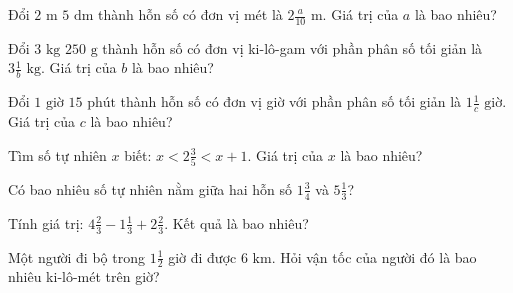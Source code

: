 \begin{ex}
  Đổi $2\text{ m } 5\text{ dm}$ thành hỗn số có đơn vị mét là $2\frac{a}{10}\text{ m}$. Giá trị của $a$ là bao nhiêu?
\end{ex}

\begin{ex}
  Đổi $3\text{ kg } 250\text{ g}$ thành hỗn số có đơn vị ki-lô-gam với phần phân số tối giản là $3\frac{1}{b}\text{ kg}$. Giá trị của $b$ là bao nhiêu?
\end{ex}

\begin{ex}
  Đổi $1\text{ giờ } 15\text{ phút}$ thành hỗn số có đơn vị giờ với phần phân số tối giản là $1\frac{1}{c}\text{ giờ}$. Giá trị của $c$ là bao nhiêu?
\end{ex}

\begin{ex}
  Tìm số tự nhiên $x$ biết: $x < 2\frac{3}{5} < x + 1$. Giá trị của $x$ là bao nhiêu?
\end{ex}

\begin{ex}
  Có bao nhiêu số tự nhiên nằm giữa hai hỗn số $1\frac{3}{4}$ và $5\frac{1}{3}$?
\end{ex}

\begin{ex}
  Tính giá trị: $4\frac{2}{3} - 1\frac{1}{3} + 2\frac{2}{3}$. Kết quả là bao nhiêu?
\end{ex}

\begin{ex}
  Một người đi bộ trong $1\frac{1}{2}$ giờ đi được $6\text{ km}$. Hỏi vận tốc của người đó là bao nhiêu ki-lô-mét trên giờ?
\end{ex}

